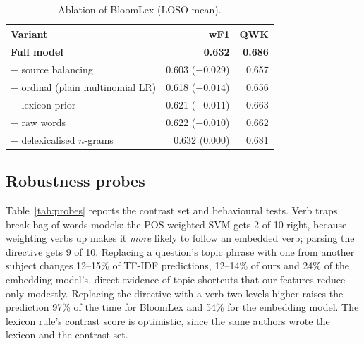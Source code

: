\documentclass[conference]{IEEEtran}
\newcommand{\best}[1]{\textbf{#1}}
\begin{document}
\begin{table}[t]
\caption{Ablation of BloomLex (LOSO mean).}
\label{tab:ablation}
\centering\footnotesize
\begin{tabular}{@{}lrr@{}}
\toprule
Variant & wF1 & QWK \\
\midrule
\best{Full model} & \best{0.632} & \best{0.686} \\
$-$ source balancing & 0.603 ($-0.029$) & 0.657 \\
$-$ ordinal (plain multinomial LR) & 0.618 ($-0.014$) & 0.656 \\
$-$ lexicon prior & 0.621 ($-0.011$) & 0.663 \\
$-$ raw words & 0.622 ($-0.010$) & 0.662 \\
$-$ delexicalised $n$-grams & 0.632 (0.000) & 0.681 \\
\bottomrule
\end{tabular}
\end{table}

\subsection{Robustness probes}
Table~\ref{tab:probes} reports the contrast set and behavioural tests. Verb traps break
bag-of-words models: the POS-weighted SVM gets 2 of 10 right, because weighting verbs up makes it
\emph{more} likely to follow an embedded verb; parsing the directive gets 9 of 10. Replacing a
question's topic phrase with one from another subject changes 12--15\% of TF-IDF predictions,
12--14\% of ours and 24\% of the embedding model's, direct evidence of topic shortcuts that our
features reduce only modestly. Replacing the directive with a verb two levels higher raises the
prediction 97\% of the time for BloomLex and 54\% for the embedding model. The lexicon rule's
contrast score is optimistic, since the same authors wrote the lexicon and the contrast set.
\end{document}
